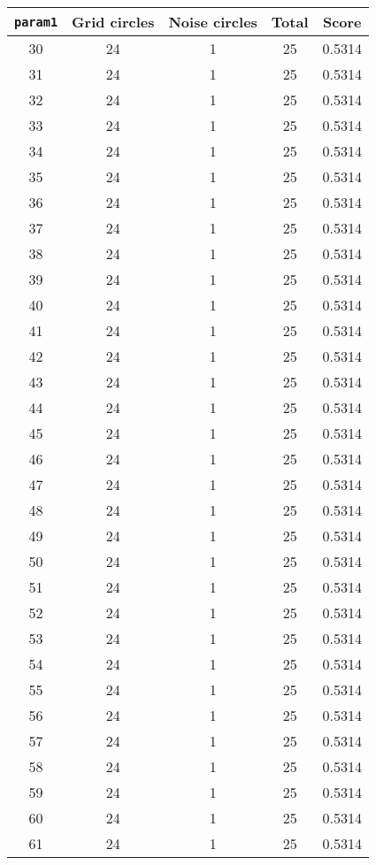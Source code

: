 \documentclass[letterpaper, 12pt]{article}
\begin{document}
\begin{longtable}{|c|c|c|c|c|}
\hline
\textbf{\texttt{param1}} & \textbf{Grid circles} & \textbf{Noise circles} & \textbf{Total} & \textbf{Score} \\
\hline
30 & 24 & 1 & 25 & 0.5314 \\
\hline
31 & 24 & 1 & 25 & 0.5314 \\
\hline
32 & 24 & 1 & 25 & 0.5314 \\
\hline
33 & 24 & 1 & 25 & 0.5314 \\
\hline
34 & 24 & 1 & 25 & 0.5314 \\
\hline
35 & 24 & 1 & 25 & 0.5314 \\
\hline
36 & 24 & 1 & 25 & 0.5314 \\
\hline
37 & 24 & 1 & 25 & 0.5314 \\
\hline
38 & 24 & 1 & 25 & 0.5314 \\
\hline
39 & 24 & 1 & 25 & 0.5314 \\
\hline
40 & 24 & 1 & 25 & 0.5314 \\
\hline
41 & 24 & 1 & 25 & 0.5314 \\
\hline
42 & 24 & 1 & 25 & 0.5314 \\
\hline
43 & 24 & 1 & 25 & 0.5314 \\
\hline
44 & 24 & 1 & 25 & 0.5314 \\
\hline
45 & 24 & 1 & 25 & 0.5314 \\
\hline
46 & 24 & 1 & 25 & 0.5314 \\
\hline
47 & 24 & 1 & 25 & 0.5314 \\
\hline
48 & 24 & 1 & 25 & 0.5314 \\
\hline
49 & 24 & 1 & 25 & 0.5314 \\
\hline
50 & 24 & 1 & 25 & 0.5314 \\
\hline
51 & 24 & 1 & 25 & 0.5314 \\
\hline
52 & 24 & 1 & 25 & 0.5314 \\
\hline
53 & 24 & 1 & 25 & 0.5314 \\
\hline
54 & 24 & 1 & 25 & 0.5314 \\
\hline
55 & 24 & 1 & 25 & 0.5314 \\
\hline
56 & 24 & 1 & 25 & 0.5314 \\
\hline
57 & 24 & 1 & 25 & 0.5314 \\
\hline
58 & 24 & 1 & 25 & 0.5314 \\
\hline
59 & 24 & 1 & 25 & 0.5314 \\
\hline
60 & 24 & 1 & 25 & 0.5314 \\
\hline
61 & 24 & 1 & 25 & 0.5314 \\

\end{longtable}
\end{document}
